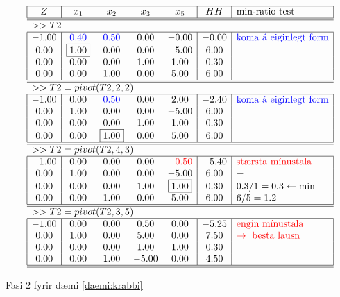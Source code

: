 \begin{lausn}
\begin{center}
\begin{table}[b!]
{\renewcommand{\arraystretch}{1.5} \renewcommand{\tabcolsep}{0.2cm}
{\scriptsize
$$\begin{array}{|c|cccc|c|l|} \hline 
 Z &  x_1 &  x_2 &   x_3 & x_5 &  HH   & \textrm{min-ratio test}\\ 
\hline\hline \multicolumn{6}{l}{>> T2 } \\ \hline
-1.00 & \color{blue}{0.40} & \color{blue}{0.50} & 0.00 & -0.00 & -0.00 & \color{blue}{\textrm{koma á eiginlegt form}}\\
0.00 & \fbox{1.00} & 0.00 & 0.00 & -5.00 & 6.00 & \\
0.00 & 0.00 & 0.00 & 1.00 & 1.00 & 0.30 & \\
0.00 & 0.00 & 1.00 & 0.00 & 5.00 & 6.00 & \\
\hline\hline\multicolumn{6}{l}{>> T2=pivot(T2,2,2)} \\ \hline 
-1.00 & 0.00 & \color{blue}{0.50} & 0.00 & 2.00 & -2.40 & \color{blue}{\textrm{koma á eiginlegt form}}\\
0.00 & 1.00 & 0.00 & 0.00 & -5.00 & 6.00 & \\
0.00 & 0.00 & 0.00 & 1.00 & 1.00 & 0.30 & \\
0.00 & 0.00 & \fbox{1.00} & 0.00 & 5.00 & 6.00 & \\
\hline\hline\multicolumn{6}{l}{>> T2=pivot(T2,4,3)} \\ \hline
-1.00 & 0.00 & 0.00 & 0.00 & \color{red}{-0.50} & -5.40 & \color{red}{\textrm{stærsta mínustala}}\\
0.00 & 1.00 & 0.00 & 0.00 & -5.00 & 6.00 & -\\
0.00 & 0.00 & 0.00 & 1.00 & \fbox{1.00} & 0.30 & 0.3/1=0.3\leftarrow\min\\
0.00 & 0.00 & 1.00 & 0.00 & 5.00 & 6.00 & 6/5=1.2\\
\hline\hline\multicolumn{6}{l}{>> T2=pivot(T2,3,5) } \\ \hline
-1.00 & 0.00 & 0.00 & 0.50 & 0.00 & -5.25 & \color{red}{\textrm{engin mínustala}}\\
0.00 & 1.00 & 0.00 & 5.00 & 0.00 & 7.50 & \color{red}{\rightarrow \textrm{ besta lausn}}\\
0.00 & 0.00 & 0.00 & 1.00 & 1.00 & 0.30 & \\ 
0.00 & 0.00 & 1.00 & -5.00 & 0.00 & 4.50 & \\ \hline\hline
\end{array}$$}}\caption{Fasi 2 fyrir dæmi \ref{daemi:krabbi}}\label{daemi:krabbi:fasi2}
\end{table}
\end{center}

\end{lausn}


